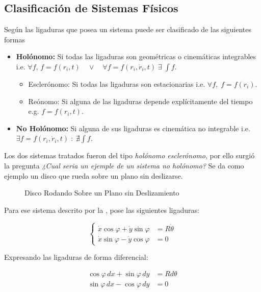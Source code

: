 \documentclass{article}
\theoremstyle{definition}
\begin{document}
\subsection{Clasificación de Sistemas Físicos}
Según las ligaduras que posea un sistema puede ser clasificado de las siguientes formas

\begin{itemize}
	\item \textbf{Holónomo:} Si todas las ligaduras son geométricas o cinemáticas integrables i.e. $\forall f, \, f = f(r_i, t) \quad \lor \quad \forall f = f(r_i, \dot{r}_i, t) \; \exists \; \int f$.
		\begin{itemize}
			\item Esclerónomo: Si todas las ligaduras son estacionarias i.e. $\forall f, \; f = f(r_i)$.
			\item Reónomo: Si alguna de las ligaduras depende explícitamente del tiempo e.g. $f = f(r_i, t)$.
		\end{itemize}
	\item \textbf{No Holónomo:} Si alguna de sus ligaduras es cinemática no integrable i.e. $\exists f = f(r_i, \dot{r}_i, t) \; : \; \nexists \int f$.
\end{itemize}

Los dos sistemas tratados fueron del tipo \emph{holónomo esclerónomo}, por ello surgió la pregunta \emph{¿Cual seria un ejemple de un sistema no holónomo?} Se da como ejemplo un disco que rueda sobre un plano sin deslizarse.

\begin{figure}[htbp!]
	\caption{Disco Rodando Sobre un Plano sin Deslizamiento}
	\label{fig:disk_rolling}
\end{figure}

Para ese sistema descrito por la , pose las siguientes ligaduras:

\begin{equation}
	\begin{cases}
		\dot{x}\cos{\varphi} + \dot{y}\sin{\varphi} &= R\dot{\theta} \\
		\dot{x}\sin{\varphi} - \dot{y}\cos{\varphi} &= 0
	\end{cases}
\end{equation}

Expresando las ligaduras de forma diferencial:

\begin{align}
	\cos{\varphi} \, dx + \sin{\varphi} \, dy &= R d\theta \label{eq:dexact_theta}\\
	\sin{\varphi} \, dx - \cos{\varphi} \, dy &= 0 \label{eq:constrained_2}
\end{align}
\end{document}
